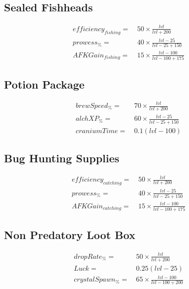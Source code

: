     \subsection{Sealed Fishheads}
        \begin{align*}
            efficiency_{fishing} = &\  50 \times \frac{{lvl}}{{lvl}+200} 
            \\
            prowess_\% = &\  40 \times \frac{{lvl}-25}{{lvl}-25+150}
            \\
            AFKGain_{fishing} = &\  15 \times \frac{{lvl}-100}{{lvl}-100+175}
        \end{align*}

    \subsection{Potion Package}
        \begin{align*}
            brewSpeed_\% = &\   70 \times \frac{{lvl}}{{lvl}+200}
            \\
            alchXP_\% = &\  60 \times \frac{{lvl}-25}{{lvl}-25+150}
            \\
            craniumTime = &\  0.1(lvl-100)
        \end{align*}

    \subsection{Bug Hunting Supplies}
        \begin{align*}
            efficiency_{catching}= &\   50 \times \frac{{lvl}}{{lvl}+200} 
            \\
            prowess_\% = &\  40 \times \frac{{lvl}-25}{{lvl}-25+150}
            \\
            AFKGain_{catching} = &\ 15 \times \frac{{lvl}-100}{{lvl}-100+175}
        \end{align*}

    \subsection{Non Predatory Loot Box}
        \begin{align*}
            dropRate_\% = &\  50 \times \frac{{lvl}}{{lvl}+200} 
            \\
            Luck = &\  0.25(lvl-25)
            \\
            crystalSpawn_\% = &\  65 \times \frac{{lvl}-100}{{lvl}-100+200}
        \end{align*}
